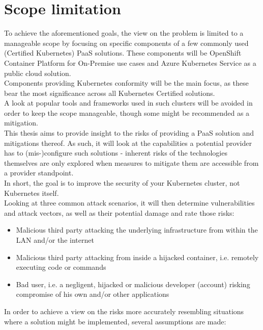 \section{Scope limitation}

To achieve the aforementioned goals, the view on the problem is limited to a manageable scope by
focusing on specific components of a few commonly used (Certified Kubernetes) PaaS solutions.
These components will be OpenShift Container Platform for On-Premise use cases and Azure Kubernetes Service as a public cloud solution. \\
Components providing Kubernetes conformity will be the main focus, as these bear the most significance across all Kubernetes Certified solutions. \\
A look at popular tools and frameworks used in such clusters will be avoided in order to keep the scope manageable, though some might be recommended as a mitigation.\\
This thesis aims to provide insight to the risks of providing a PaaS solution and mitigations thereof. 
As such, it will look at the capabilities a potential provider has to (mis-)configure such solutions - inherent risks of the technologies themselves are only explored when measures to mitigate them are accessible from a provider standpoint. \\
In short, the goal is to improve the security of your Kubernetes cluster, not Kubernetes itself.\\
Looking at three common attack scenarios, it will then determine vulnerabilities and attack vectors,
as well as their potential damage and rate those risks:

\begin{itemize}

\item Malicious third party attacking the underlying infrastructure from within the LAN and/or the internet

\item Malicious third party attacking from inside a hijacked container, i.e. remotely executing code or commands

\item Bad user, i.e. a negligent, hijacked or malicious developer (account) risking compromise of his own and/or other applications

\end{itemize}

In order to achieve a view on the risks more accurately resembling situations where a solution might be implemented, several assumptions are made:

